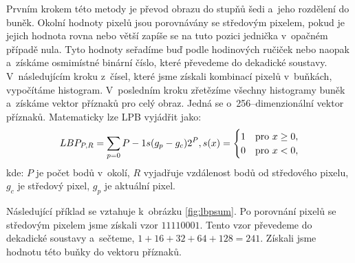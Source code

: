Prvním krokem této metody je převod obrazu do stupňů šedi a~jeho rozdělení do buněk. Okolní hodnoty pixelů jsou porovnávány se středovým pixelem, pokud je jejich hodnota rovna nebo větší zapíše se na tuto pozici jednička v~opačném případě nula. Tyto hodnoty seřadíme buď podle hodinových ručiček nebo naopak a~získáme osmimístné binární číslo, které převedeme do dekadické soustavy. V~následujícím kroku z~čísel, které jsme získali kombinací pixelů v~buňkách, vypočítáme histogram. V~posledním kroku zřetězíme všechny histogramy buněk a~získáme vektor příznaků pro celý obraz. Jedná se o~256--dimenzionální vektor příznaků. 
Matematicky lze LPB vyjádřit jako:
\begin{equation*}
LBP_{P,R} = \sum_{p=0}{P-1} s(g_p - g_c)2^P, \\
s(x) =
  \begin{cases} 
   1 & \text{pro } x \geq 0, \\
   0       & \text{pro } x < 0,
  \end{cases}
\end{equation*}
kde: $P$ je počet bodů v~okolí, $R$ vyjadřuje vzdálenost bodů od středového pixelu, $g_c$ je středový pixel, $g_p$ je aktuální pixel. 

Následující příklad se vztahuje k~obrázku \ref{fig:lbpsum}. Po porovnání pixelů se středovým pixelem jsme získali vzor $11110001$. Tento vzor převedeme do dekadické soustavy a~sečteme, $ 1+16+32+64+128 = 241$. Získali jsme hodnotu této buňky do vektoru příznaků.

